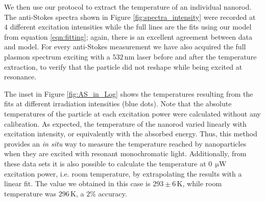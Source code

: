 \documentclass[journal=nalefd,manuscript=letter]{achemso}
\newcommand{\HI}[1]{{#1}} %
\newcommand{\K}{\ensuremath{\,\textrm{K}}}
\newcommand{\nm}{\ensuremath{\,\textrm{nm}}}
\newcommand{\uW}{\ensuremath{\,\upmu\textrm{W}}}
\begin{document}
\HI{We then use our protocol to extract the temperature of an individual nanorod. 
The anti-Stokes spectra shown in Figure \ref{fig:spectra_intensity} were}
recorded at $4$ different excitation intensities while the full lines are the
fits \HI{using our model from equation \ref{eqn:fitting}}; 
again, there is an excellent agreement between data and model. For every
anti-Stokes measurement we have also acquired the full plasmon spectrum 
exciting with a $532\nm$ laser before and after the temperature extraction,
to verify that the particle did not reshape while being excited at resonance. 

The inset in Figure \ref{fig:AS_in_Log} shows the temperatures resulting from
the fits at different irradiation intensities (blue dots). Note
that the absolute temperatures of the particle at each excitation power were
calculated without any calibration. As expected, the temperature of the nanorod
\HI{varied linearly with} excitation intensity, or equivalently with the absorbed
energy. Thus, this method provides an \textit{in situ} way to measure the
temperature reached by nanoparticles when they are excited with resonant
monochromatic light. Additionally, from these data sets it  is also possible to
calculate the temperature at $0\uW$ excitation power, i.e. room temperature, by
extrapolating the results with a linear fit. The value we obtained in this case
is $293\pm 6 \K$, while room temperature was $296\K$, a $2\%$ accuracy.
\end{document}
